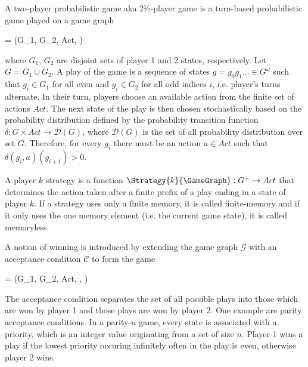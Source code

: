 \stopsubsection


\startsubsection[title={2-Player Probabilistic Games},reference=sec:theory-games-games]

    A two-player probabilistic game aka 2½-player game is a turn-based probabilistic game played on a game graph

    \startformula
         = (G_1, G_2, Act, \delta) \EndComma
    \stopformula

    where $G_1$, $G_2$ are disjoint sets of player 1 and 2 states, respectively.
    Let $G = G_1 \cup G_2$.
    A play of the game is a sequence of states $g = g_0 g_1 ... \in G^\omega$ such that $g_i \in G_1$ for all even and $g_i \in G_2$ for all odd indices $i$, i.e. player's turns alternate.
    In their turn, players choose an available action from the finite set of actions $Act$.
    The next state of the play is then chosen stochastically based on the probability distribution defined by the probability transition function $\delta: G \times Act \rightarrow \mathcal{D}(G)$, where $\mathcal{D}(G)$ is the set of all probability distribution over set $G$.
    Therefore, for every $g_i$ there must be an action $a \in Act$ such that $\delta(g_i, a)(g_{i+1}) \gt 0$.

    A player $k$ strategy is a function $\Strategy{k}{\GameGraph}: G^+ \rightarrow Act$ that determines the action taken after a finite prefix of a play ending in a state of player $k$.
    If a strategy uses only a finite memory, it is called finite-memory and if it only uses the one memory element (i.e. the current game state), it is called memoryless.

\stopsubsection


\startsubsection[title={Winning and Solving 2-Player Probabilistic Games}]

    A notion of winning is introduced by extending the game graph $\mathcal{G}$ with an acceptance condition $\mathcal{C}$ to form the game

    \startformula
         = (G_1, G_2, Act, \delta, ) \EndPeriod
    \stopformula

    The acceptance condition separates the set of all possible plays into those which are won by player 1 and those plays are won by player 2.
    One example are parity acceptance conditions.
    In a parity-$n$ game, every state is associated with a priority, which is an integer value originating from a set of size $n$.
    Player 1 wins a play if the lowest priority occuring infinitely often in the play is even, otherwise player 2 wins.

